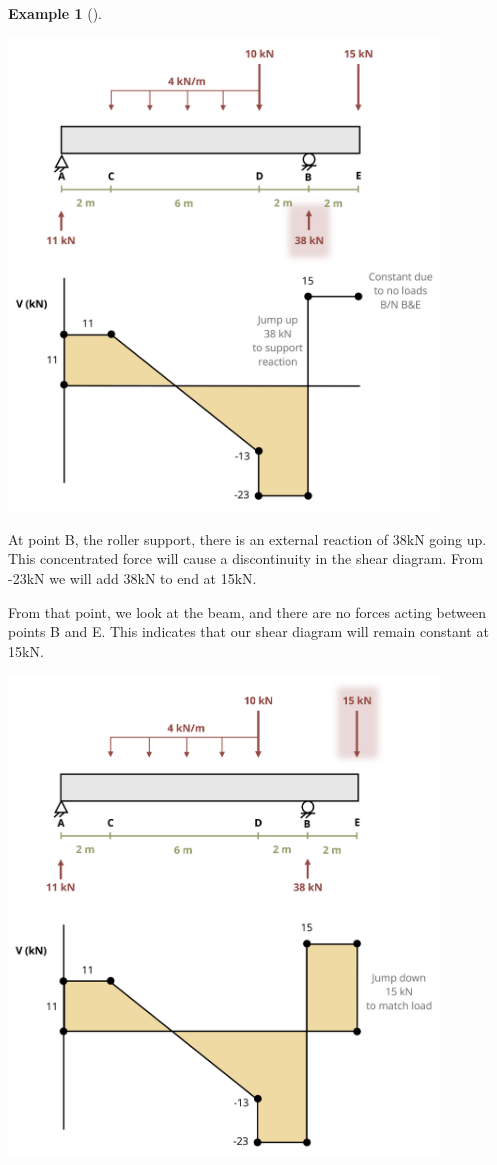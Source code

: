 \documentclass[
  letterpaper,
  DIV=11,
  numbers=noendperiod]{scrreprt}
\theoremstyle{definition}
\newtheorem{example}{Example}[chapter]
\theoremstyle{remark}
\begin{document}
\begin{tcolorbox}
\begin{example}[]
\begin{tcolorbox}
\begin{center}
\includegraphics[width=4.51042in,height=\textheight]{images/CH7 PNGs/example 7.3 part 6.png}
\end{center}

At point B, the roller support, there is an external reaction of 38kN
going up. This concentrated force will cause a discontinuity in the
shear diagram. From -23kN we will add 38kN to end at 15kN.

From that point, we look at the beam, and there are no forces acting
between points B and E. This indicates that our shear diagram will
remain constant at 15kN.

\begin{center}
\includegraphics[width=4.5in,height=\textheight]{images/CH7 PNGs/example 7.3 part 7.png}
\end{center}


\end{tcolorbox}
\end{example}
\end{tcolorbox}
\end{document}

